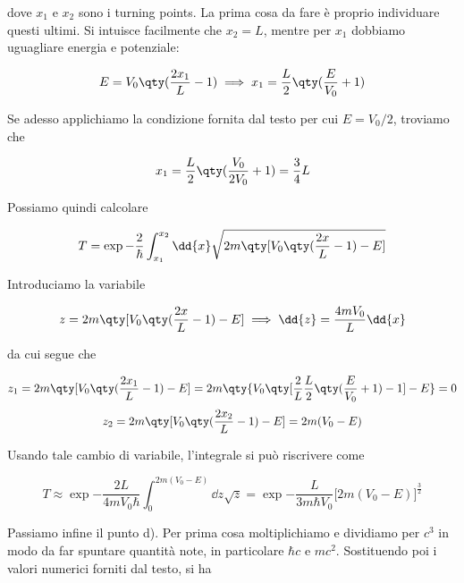 \begin{soluzione}
   dove $x_1$ e $x_2$ sono i turning points. La prima cosa da fare è proprio individuare questi ultimi. Si intuisce facilmente che $x_2=L$, mentre per $x_1$ dobbiamo uguagliare energia e potenziale:

   \begin{equation*}
      E=V_0\qty( \frac{2x_1}{L} - 1 )
      \implies
      x_1
      =\frac{L}{2}\qty( \frac{E}{V_0} + 1 )
   \end{equation*}

   Se adesso applichiamo la condizione fornita dal testo per cui $E=V_0/2$, troviamo che

   \begin{equation*}
      x_1
      =\frac{L}{2}\qty( \frac{V_0}{2V_0} + 1 )
      =\frac{3}{4} L
   \end{equation*}

   Possiamo quindi calcolare

   \begin{gather*}
      T
      =\exp{ -\frac{2}{\hbar} \int_{x_1}^{x_2} \dd{x} \sqrt{ 2m \qty[ V_0\qty( \frac{2x}{L} - 1 ) - E ] } }
   \end{gather*}

   Introduciamo la variabile

   \begin{equation*}
      z=2m \qty[ V_0\qty( \frac{2x}{L} - 1 ) - E ]
      \implies
      \dd{z}=\frac{4mV_0}{L} \dd{x}
   \end{equation*}

   da cui segue che

   \begin{gather*}
      z_1
      =2m \qty[ V_0\qty( \frac{2x_1}{L} - 1 ) - E ]
      =2m \qty{ V_0\qty[ \frac{2}{L} \frac{L}{2}\qty( \frac{E}{V_0} + 1 ) - 1 ] - E }
      =0
      \\[0.1cm]
      z_2
      =2m \qty[ V_0\qty( \frac{2x_2}{L} - 1 ) - E ]
      =2m (V_0 - E)
   \end{gather*}

   Usando tale cambio di variabile, l'integrale si può riscrivere come

   \begin{equation*}
      T
      \approx
      \exp{ -\frac{2L}{4 m V_0 \hbar} \int_{0}^{2m(V_0 - E)} \dd{z} \sqrt{z} }
      =\exp{ -\frac{L}{3 m \hbar V_0} \bigl[ 2m(V_0 - E) \bigr]^{\frac{3}{2}} }
   \end{equation*}

   Passiamo infine il punto d). Per prima cosa moltiplichiamo e dividiamo per $c^3$ in modo da far spuntare quantità note, in particolare $\hbar c$ e $mc^2$. Sostituendo poi i valori numerici forniti dal testo, si ha


\end{soluzione}
